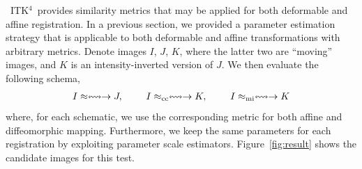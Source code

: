 \documentclass{frontiersSCNS}
\newcommand{\tk}{~ITK$^{\text{4}}$~}
\begin{document}
\tk provides similarity metrics that may be applied for both
deformable and affine registration.  In a previous section, we
provided a parameter estimation strategy that is applicable to both
deformable and affine transformations with arbitrary metrics.  Denote
images $I$, $J$, $K$, where the latter two are ``moving'' images, and
$K$ is an intensity-inverted version of $J$.
We then evaluate the following schema,
\begin{eqnarray}
I \approx \leftrightsquigarrow  \rightarrow J,~~~~~~~
I \approx_\text{cc} \leftrightsquigarrow  \rightarrow  K,~~~~~~~  
I \approx_\text{mi} \leftrightsquigarrow  \rightarrow  K   \notag 
\end{eqnarray}
where, for each schematic, we use the corresponding metric for both
affine and diffeomorphic mapping.  Furthermore, we keep the same
parameters for each registration by exploiting parameter scale
estimators.  Figure~\ref{fig:result} shows the candidate images for
this test. 
\end{document}
